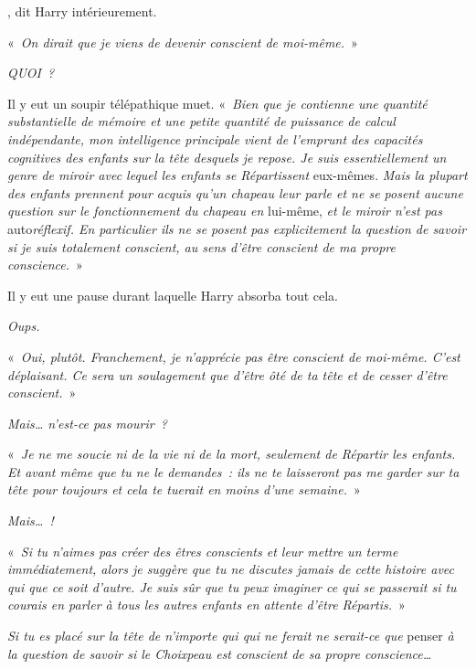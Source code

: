 

, dit Harry intérieurement.

\hplettrineextrapara
«~\emph{On dirait que je viens de devenir conscient de moi-même.}~»

\emph{QUOI~?}

Il y eut un soupir télépathique muet.
«~\emph{Bien que je contienne une quantité substantielle de mémoire et une petite quantité de puissance de calcul indépendante, mon intelligence principale vient de l'emprunt des capacités cognitives des enfants sur la tête desquels je repose.
Je suis essentiellement un genre de miroir avec lequel les enfants se Répartissent} eux-mêmes.
\emph{Mais la plupart des enfants prennent pour acquis qu'un chapeau leur parle et ne se posent aucune question sur le fonctionnement du chapeau en} lui-même, \emph{et le miroir n'est pas} auto\emph{réflexif. En particulier ils ne se posent pas explicitement la question de savoir si je suis totalement conscient, au sens d'être conscient de ma propre conscience.}~»

Il y eut une pause durant laquelle Harry absorba tout cela.

\emph{Oups.}

«~\emph{Oui, plutôt. Franchement, je n'apprécie pas être conscient de moi-même. C'est déplaisant. Ce sera un soulagement que d'être ôté de ta tête et de cesser d'être conscient.}~»

\emph{Mais… n'est-ce pas mourir~?}

«~\emph{Je ne me soucie ni de la vie ni de la mort, seulement de Répartir les enfants.
Et avant même que tu ne le demandes~: ils ne te laisseront pas me garder sur ta tête pour toujours et cela te tuerait en moins d'une semaine.}~»

\emph{Mais…~!}

«~\emph{Si tu n'aimes pas créer des êtres conscients et leur mettre un terme immédiatement, alors je suggère que tu ne discutes jamais de cette histoire avec qui que ce soit d'autre.
Je suis sûr que tu peux imaginer ce qui se passerait si tu courais en parler à tous les autres enfants en attente d'être Répartis.}~»

\emph{Si tu es placé sur la tête de n'importe qui qui ne ferait ne serait-ce que} penser \emph{à la question de savoir si le Choixpeau est conscient de sa propre conscience…}

